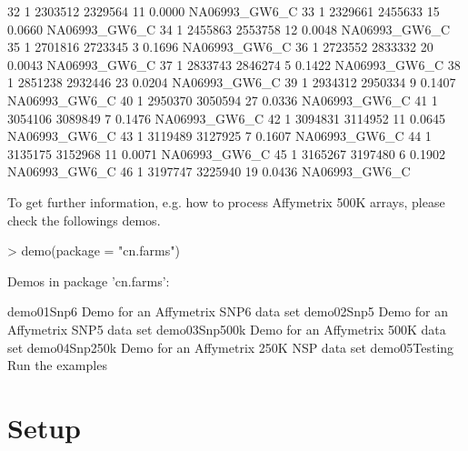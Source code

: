 \documentclass[article]{bioinf}
\begin{document}
\begin{Schunk}
\begin{Soutput}
32     1 2303512 2329564       11   0.0000 NA06993_GW6_C
33     1 2329661 2455633       15   0.0660 NA06993_GW6_C
34     1 2455863 2553758       12   0.0048 NA06993_GW6_C
35     1 2701816 2723345        3   0.1696 NA06993_GW6_C
36     1 2723552 2833332       20   0.0043 NA06993_GW6_C
37     1 2833743 2846274        5   0.1422 NA06993_GW6_C
38     1 2851238 2932446       23   0.0204 NA06993_GW6_C
39     1 2934312 2950334        9   0.1407 NA06993_GW6_C
40     1 2950370 3050594       27   0.0336 NA06993_GW6_C
41     1 3054106 3089849        7   0.1476 NA06993_GW6_C
42     1 3094831 3114952       11   0.0645 NA06993_GW6_C
43     1 3119489 3127925        7   0.1607 NA06993_GW6_C
44     1 3135175 3152968       11   0.0071 NA06993_GW6_C
45     1 3165267 3197480        6   0.1902 NA06993_GW6_C
46     1 3197747 3225940       19   0.0436 NA06993_GW6_C
\end{Soutput}
\end{Schunk}

\noindent To get further information, e.g. how to process Affymetrix 500K arrays, please check the followings demos.  

\begin{Sinput}
> demo(package = "cn.farms")

Demos in package 'cn.farms':

demo01Snp6            Demo for an Affymetrix SNP6 data set
demo02Snp5            Demo for an Affymetrix SNP5 data set
demo03Snp500k         Demo for an Affymetrix 500K data set
demo04Snp250k         Demo for an Affymetrix 250K NSP data set
demo05Testing         Run the examples
\end{Sinput}

\section{Setup}
\label{sec:setup}
\end{document}
